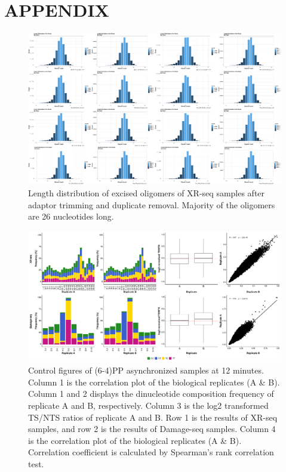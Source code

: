 \setlength{\parindent}{0pt}
\chapter{\bf APPENDIX} 

\shorthandoff{=}

\begin{figure}[H]
\begin{center}
\includegraphics[width=\textwidth]{Chapters/7_appendix/figures/supfig1}
\caption[Length distribution of excised oligomers of XR-seq samples.]{Length distribution of excised oligomers of XR-seq samples after adaptor trimming and duplicate removal. Majority of the oligomers are 26 nucleotides long.}
\label{supfig:length}
\end{center}
\end{figure}


\begin{figure}[H]
\begin{center}
\includegraphics[width=\textwidth]{Chapters/7_appendix/figures/supfig2}
\caption[Control figures of (6-4)PP asynchronized samples at 12 minutes.]{Control figures of (6-4)PP asynchronized samples at 12 minutes. Column 1 is the correlation plot of the biological replicates (A \& B). Column 1 and 2 displays the dinucleotide composition frequency of replicate A and B, respectively. Column 3 is the log2 transformed TS/NTS ratios of replicate A and B. Row 1 is the results of XR-seq samples, and row 2 is the results of Damage-seq samples. Column 4 is the correlation plot of the biological replicates (A \& B). Correlation coefficient is calculated by Spearman’s rank correlation test.}
\label{supfig:control1}
\end{center}
\end{figure}


